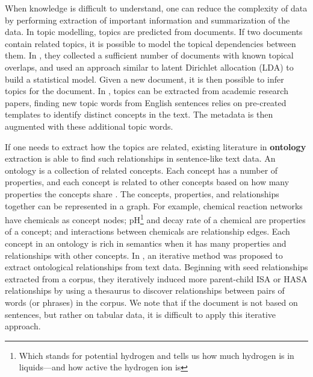 When knowledge is difficult to understand, one can reduce the complexity of data by performing extraction of important information and summarization of the data. In topic modelling, topics are predicted from documents. If two documents contain related topics, it is possible to model the topical dependencies between them. In \cite{Zolaktaf2012Modeling}, they collected a sufficient number of documents with known topical overlaps, and used an approach similar to latent Dirichlet allocation (LDA) to build a statistical model. Given a new document, it is then possible to infer topics for the document. In \cite{Nargesian2018Table}, topics can be extracted from academic research papers, finding new topic words from English sentences relies on pre-created templates to identify distinct concepts in the text. The metadata is then augmented with these additional topic words.

If one needs to extract how the topics are related, existing literature in \textbf{\gls{ontology}} extraction is able to find such relationships in sentence-like text data. An ontology is a collection of related concepts. Each concept has a number of properties, and each concept is related to other concepts based on how many properties the concepts share \cite{cruz2005role}. The concepts, properties, and relationships together can be represented in a graph. For example, chemical reaction networks have chemicals as concept nodes; pH\footnote{Which stands for potential hydrogen and tells us how much hydrogen is in liquids—and how active the hydrogen ion is} and decay rate of a chemical are properties of a concept; and interactions between chemicals are relationship edges. Each concept in an ontology is rich in semantics when it has many properties and relationships with other concepts. In \cite{10.1145/2396761.2398468}, an iterative method was proposed to extract ontological relationships from text data. Beginning with seed relationships extracted from a corpus, they iteratively induced more parent-child ISA or HASA relationships by using a thesaurus to discover relationships between pairs of words (or phrases) in the corpus. We note that if the document is not based on sentences, but rather on tabular data, it is difficult to apply this iterative approach.

